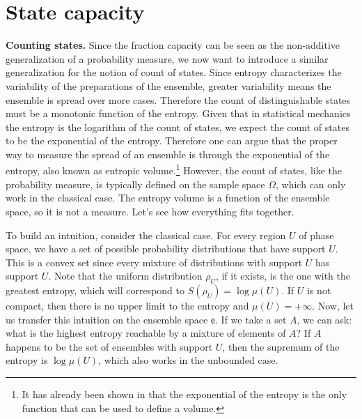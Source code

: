 \documentclass[10pt,twocolumn, nofootinbib]{revtex4-2}
\newcommand{\ens}[1][e] {\mathsf{#1}} %
\begin{document}
\section{State capacity}

\textbf{Counting states.} Since the fraction capacity can be seen as the non-additive generalization of a probability measure, we now want to introduce a similar generalization for the notion of count of states. Since entropy characterizes the variability of the preparations of the ensemble, greater variability means the ensemble is spread over more cases. Therefore the count of distinguishable states must be a monotonic function of the entropy. Given that in statistical mechanics the entropy is the logarithm of the count of states, we expect the count of states to be the exponential of the entropy. Therefore one can argue that the proper way to measure the spread of an ensemble is through the exponential of the entropy, also known as entropic volume.\footnote{It has already been shown in \cite{hall1999} that the exponential of the entropy is the only function that can be used to define a volume.} However, the count of states, like the probability measure, is typically defined on the sample space $\Omega$, which can only work in the classical case. The entropy volume is a function of the ensemble space, so it is not a measure. Let's see how everything fits together.

To build an intuition, consider the classical case. For every region $U$ of phase space, we have a set of possible probability distributions that have support $U$. This is a convex set since every mixture of distributions with support $U$ has support $U$. Note that the uniform distribution $\rho_U$, if it exists, is the one with the greatest entropy, which will correspond to $S(\rho_U) = \log \mu(U)$. If $U$ is not compact, then there is no upper limit to the entropy and $\mu(U) = +\infty$. Now, let us transfer this intuition on the ensemble space $\ens$. If we take a set $A$, we can ask: what is the highest entropy reachable by a mixture of elements of $A$? If $A$ happens to be the set of ensembles with support $U$, then the supremum of the entropy is $\log \mu(U)$, which also works in the unbounded case.
\end{document}
